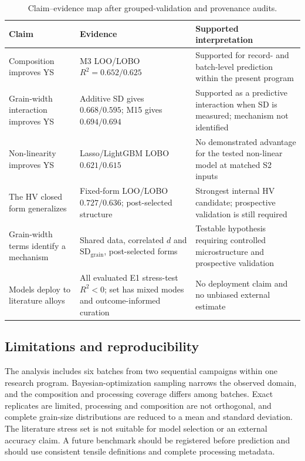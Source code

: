 \documentclass[5p,times,twocolumn]{elsarticle}
\begin{document}
\begin{table}[t]
\centering
\caption{Claim--evidence map after grouped-validation and provenance audits.}
\label{tab:evidence}
\small
\begin{tabularx}{\textwidth}{@{}p{3.4cm}p{5.4cm}X@{}}
\toprule
Claim & Evidence & Supported interpretation \\
\midrule
Composition improves YS & M3 LOO/LOBO $R^2=0.652/0.625$ & Supported for record- and batch-level prediction within the present program \\
Grain-width interaction improves YS & Additive SD gives $0.668/0.595$; M15 gives $0.694/0.694$ & Supported as a predictive interaction when SD is measured; mechanism not identified \\
Non-linearity improves YS & Lasso/LightGBM LOBO $0.621/0.615$ & No demonstrated advantage for the tested non-linear model at matched S2 inputs \\
The HV closed form generalizes & Fixed-form LOO/LOBO $0.727/0.636$; post-selected structure & Strongest internal HV candidate; prospective validation is still required \\
Grain-width terms identify a mechanism & Shared data, correlated $d$ and $\mathrm{SD}_{\mathrm{grain}}$, post-selected forms & Testable hypothesis requiring controlled microstructure and prospective validation \\
Models deploy to literature alloys & All evaluated E1 stress-test $R^2<0$; set has mixed modes and outcome-informed curation & No deployment claim and no unbiased external estimate \\
\bottomrule
\end{tabularx}
\end{table}

\subsection{Limitations and reproducibility}

The analysis includes six batches from two sequential campaigns within one research program. Bayesian-optimization sampling narrows the observed domain, and the composition and processing coverage differs among batches. Exact replicates are limited, processing and composition are not orthogonal, and complete grain-size distributions are reduced to a mean and standard deviation. The literature stress set is not suitable for model selection or an external accuracy claim. A future benchmark should be registered before prediction and should use consistent tensile definitions and complete processing metadata.
\end{document}
